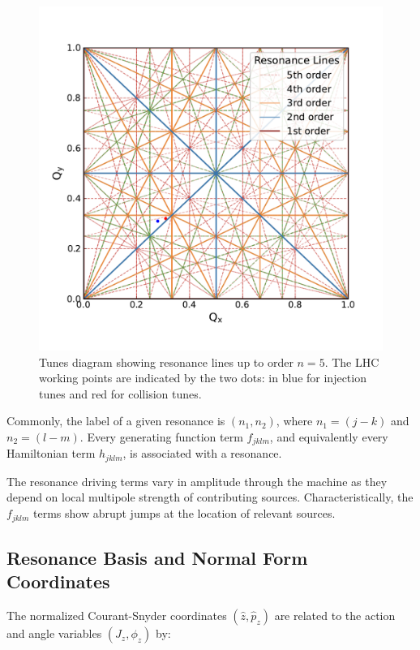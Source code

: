 \begin{figure}[!htb]
    \centering
    \includegraphics[width = 0.9\linewidth]{Figures/Beam_Dynamics_Theory/tune_diagram_fifth_order_with_working_points.pdf}
    \caption{Tunes diagram showing resonance lines up to order \(n = 5\). The LHC working points are indicated by the two dots: in \textcolor{wpblue}{blue} for injection tunes and \textcolor{wpred}{red} for collision tunes.}
    \label{figure:tune_diagram_fifth_order}
\end{figure}

Commonly, the label of a given resonance is \(\left( n_1, n_2 \right)\), where \(n_1 = \left( j - k \right)\) and \(n_2 = \left( l - m \right)\).
Every generating function term \(f_{jklm}\), and equivalently every Hamiltonian term \(h_{jklm}\), is associated with a resonance.

The resonance driving terms vary in amplitude through the machine as they depend on local multipole strength of contributing sources.
Characteristically, the \(f_{jklm}\) terms show abrupt jumps at the location of relevant sources.

\subsection{Resonance Basis and Normal Form Coordinates}

The normalized Courant-Snyder coordinates \(\left( \hat{z}, \hat{p}_z \right)\) are related to the action and angle variables \(\left( J_z, \phi_z \right)\) by:

